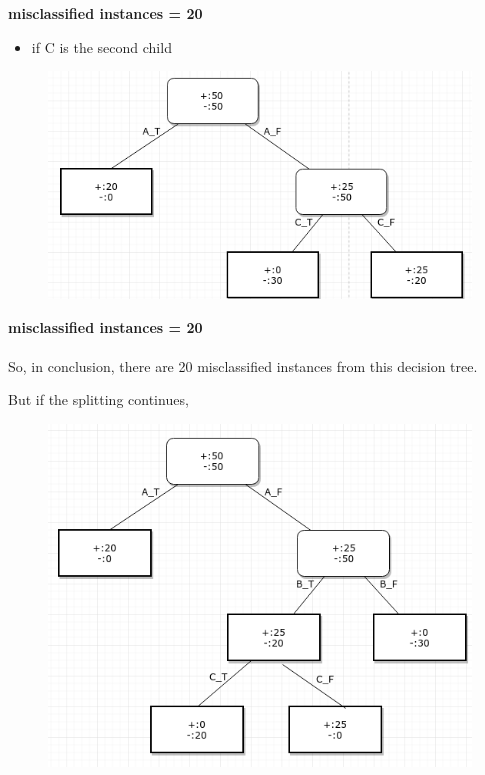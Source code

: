 \documentclass[11pt]{article}
\makeatletter
\def\maxwidth{\ifdim\Gin@nat@width>\linewidth\linewidth
    \else\Gin@nat@width\fi}
\let\Oldincludegraphics\includegraphics
\renewcommand{\includegraphics}[1]{\Oldincludegraphics[width=.8\maxwidth]{#1}}
\providecommand{\tightlist}{%
      \setlength{\itemsep}{0pt}\setlength{\parskip}{0pt}}
\makeatother
\begin{document}
\textbf{misclassified instances = 20}

\begin{itemize}
\tightlist
\item
  if C is the second child
\end{itemize}

\begin{figure}[H]
\centering
\includegraphics{6.png}
\caption{}
\end{figure}

\textbf{misclassified instances = 20}
\\\\
So, in conclusion, there are 20 misclassified instances from this decision
tree.


But if the splitting continues, 

\begin{figure}[H]
	\centering
	\includegraphics{4.png}
	\caption{}
\end{figure}
\end{document}
